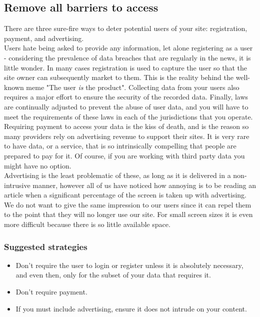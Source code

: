 \subsection{Remove all barriers to access}

There are three sure-fire ways to deter potential users of your site: registration, payment, and advertising.\\

Users hate being asked to provide any information, let alone registering as a user - considering the prevalence of data breaches that are regularly in the news, it is little wonder.
In many cases registration is used to capture the user so that the site owner can subsequently market to them.
This is the reality behind the well-known meme "The user \emph{is} the product".
Collecting data from your users also requires a major effort to ensure the security of the recorded data.
Finally, laws are continually adjusted to prevent the abuse of user data, and you will have to meet the requirements of these laws in each of the jurisdictions that you operate. \\

Requiring payment to access your data is the kiss of death, and is the reason so many providers rely on advertising 
revenue to support their sites. It is very rare to have data, or a service, that is so intrinsically compelling that
people are prepared to pay for it.
Of course, if you are working with third party data you might have no option. \\

Advertising is the least problematic of these, as long as it is delivered in a non-intrusive manner, however
all of us have noticed how annoying is to be reading an article when a significant percentage of the screen is taken up with advertising.
We do not want to give the same impression to our users since it can repel them to the point that they will no longer
use our site. For small screen sizes it is even more difficult because there is so little available space.\\

\subsubsection*{Suggested strategies} 

\begin{itemize}
    \item Don't require the user to login or register unless it is absolutely necessary, and even then, only for the subset
    of your data that requires it.
    \item Don't require payment.
    \item If you must include advertising, ensure it does not intrude on your content.
\end{itemize}

